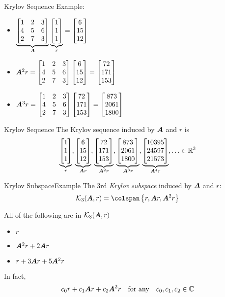 \documentclass{beamer}
\begin{document}
\begin{frame}{Krylov Sequence}%
Example:
\begin{itemize}
\item $\underbrace{\begin{bmatrix} 1& 2& 3\\4& 5& 6\\ 2 &7 &3\end{bmatrix}}_{\bm{A}}
\underbrace{\begin{bmatrix} 1\\1\\1\end{bmatrix}}_r = \begin{bmatrix} 6 \\15 \\12 \end{bmatrix}$

\item $\bm{A}^2r = \begin{bmatrix} 1& 2& 3\\4& 5& 6\\ 2 &7 &3\end{bmatrix} \begin{bmatrix} 6 \\15 \\12 \end{bmatrix}
= \begin{bmatrix} 72 \\171 \\153\end{bmatrix}$

\item $\bm{A}^3r = \begin{bmatrix} 1& 2& 3\\4& 5& 6\\ 2 &7 &3\end{bmatrix} \begin{bmatrix} 72 \\171 \\153\end{bmatrix}
= \begin{bmatrix} 873 \\2061 \\1800\end{bmatrix}$
\end{itemize}
\end{frame}


\begin{frame}{Krylov Sequence}%
The Krylov sequence induced by $\bm{A}$ and $r$ is 
\[
\underbrace{\begin{bmatrix} 1\\1\\1\end{bmatrix}}_r, \underbrace{\begin{bmatrix} 6 \\15 \\12 \end{bmatrix}}_{\bm{A} r}, 
\underbrace{\begin{bmatrix} 72 \\171 \\153\end{bmatrix}}_{\bm{A}^2 r}, \underbrace{\begin{bmatrix} 873 \\2061 \\1800\end{bmatrix}}_{\bm{A}^3 r},
\underbrace{\begin{bmatrix} 10395\\24597\\21573\end{bmatrix}}_{\bm{A}^4 r},\ldots \in \mathbb{R}^3
\]
\end{frame}


\begin{frame}{Krylov Subspace}{Example}%
The $3$rd \emph{Krylov subspace} induced by $\bm{A}$ and $r$:
\[
\krylov{3}{\A}{r} = \colspan\left\{r,\A r,\A^2 r \right\}
\]


All of the following are in $\mathcal{K}_{3}({\bm{A}},{r})$
\begin{itemize}
\item $r$
\item $\bm{A}^2 r + 2\bm{A} r$
\item $ r + 3 \bm{A} r + 5 \bm{A}^2 r$  
\end{itemize}

In fact, 
\[
c_0 r + c_1 \bm{A} r + c_2 \bm{A}^2 r  \quad\text{for any}\quad c_0,c_1,c_2\in \mathbb{C}
\]
\end{frame}
\end{document}
